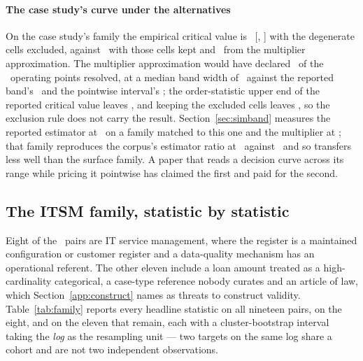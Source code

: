 \paragraph{The case study's curve under the alternatives}
On the case study's family the empirical critical value is \dcaQEmp\
[\dcaQEmpLo, \dcaQEmpHi] with the degenerate cells excluded, against
\dcaQEmpAll\ with those cells kept and \dcaQ\ from the multiplier
approximation. The multiplier approximation would have declared
\nBeneficialSimultaneous\ of the \nDcGrid\ operating points resolved, at a
median band width of \dcBandWidth\ against the reported band's
\dcBandWidthEmp\ and the pointwise interval's \dcPointWidth; the
order-statistic upper end of the reported critical value leaves
\nBeneficialSimultaneousEmpHi, and keeping the excluded cells leaves
\nBeneficialSimultaneousEmpAll, so the exclusion rule does not carry the
result. Section~\ref{sec:simband} measures the reported estimator at
\covEmpHeavyCaseAtDesign\ on a family matched to this one and the multiplier
at \covMultHeavyCaseAtDesign; that family reproduces the corpus's estimator
ratio at \ratioSynthDca\ against \ratioCorpusDca\ and so transfers less well
than the surface family. A paper that reads a decision curve across its range
while pricing it pointwise has claimed the first and paid for the second.

\subsection{The ITSM family, statistic by statistic}
\label{app:itsmfamily}


Eight of the \nPairs\ pairs are IT service management, where the register is a
maintained configuration or customer register and a data-quality mechanism has
an operational referent. The other eleven include a loan amount treated as a
high-cardinality categorical, a case-type reference nobody curates and an
article of law, which Section~\ref{app:construct} names as threats to
construct validity. Table~\ref{tab:family} reports every headline statistic on
all nineteen pairs, on the eight, and on the eleven that remain, each with a
cluster-bootstrap interval taking the \emph{log} as the resampling unit ---
two targets on the same log share a cohort and are not two independent
observations.

